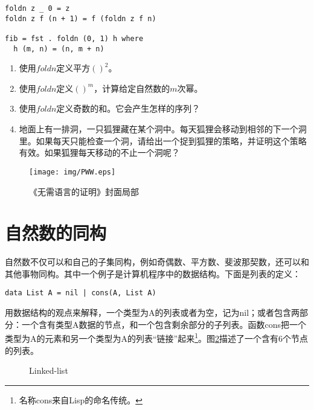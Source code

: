 \documentclass[UTF8]{article}
\begin{document}
\lstset{frame=single}
\begin{lstlisting}
foldn z _ 0 = z
foldn z f (n + 1) = f (foldn z f n)

fib = fst . foldn (0, 1) h where
  h (m, n) = (n, m + n)
\end{lstlisting}

\begin{Exercise}
\begin{enumerate}
\item 使用$foldn$定义平方$()^2$。
\item 使用$foldn$定义$()^m$，计算给定自然数的$m$次幂。
\item 使用$foldn$定义奇数的和。它会产生怎样的序列？
\item 地面上有一排洞，一只狐狸藏在某个洞中。每天狐狸会移动到相邻的下一个洞里。如果每天只能检查一个洞，请给出一个捉到狐狸的策略，并证明这个策略有效。如果狐狸每天移动的不止一个洞呢\cite{Gusen2014}？
\end{enumerate}
\end{Exercise}

\begin{figure}[htbp]
 \centering
 \texttt{[image: img/PWW.eps]}
 \caption{《无需语言的证明》封面局部}
 \label{fig:PWW}
\end{figure}

\section{自然数的同构}

自然数不仅可以和自己的子集同构，例如奇偶数、平方数、斐波那契数，还可以和其他事物同构。其中一个例子是计算机程序中的数据结构。下面是列表的定义：

\lstset{frame=none}
\begin{lstlisting}
data List A = nil | cons(A, List A)
\end{lstlisting}

用数据结构的观点来解释，一个类型为A的列表或者为空，记为nil；或者包含两部分：一个含有类型A数据的节点，和一个包含剩余部分的子列表。函数cons把一个类型为A的元素和另一个类型为A的列表“链接”起来\footnote{名称cons来自Lisp的命名传统。}。图\ref{fig:linked-list}描述了一个含有6个节点的列表。

\begin{figure}[htbp]
\centering
{}
\caption{Linked-list}
\label{fig:linked-list}
\end{figure}
\end{document}
